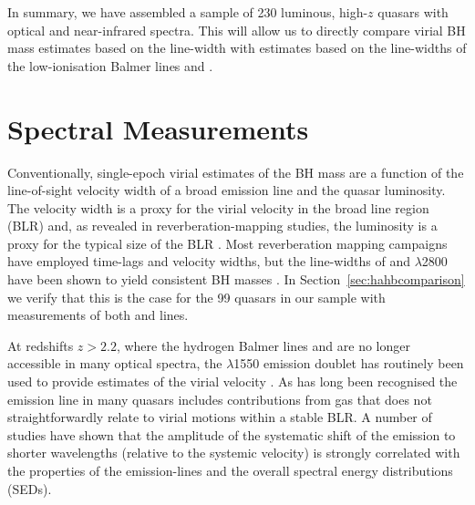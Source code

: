 In summary, we have assembled a sample of 230 luminous, high-$z$ quasars with optical and near-infrared spectra.
This will allow us to directly compare virial BH mass estimates based on the  line-width with estimates based on the line-widths of the low-ionisation Balmer lines \ha and \hbns.  

\section{Spectral Measurements}

Conventionally, single-epoch virial estimates of the BH mass are a function of the line-of-sight velocity width of a broad emission line and the quasar luminosity. 
The velocity width is a proxy for the virial velocity in the broad line region (BLR) and, as revealed in reverberation-mapping studies, the luminosity is a proxy for the typical size of the BLR \citep[the $R-L$ relation; e.g.][]{kaspi00,kaspi07}. 
Most reverberation mapping campaigns have employed \hb time-lags and velocity widths, but the line-widths of \ha and $\lambda$2800 have been shown to yield consistent BH masses \citep[e.g.][]{mclure02,greene05,onken08,shen08,wang09,rafiee11,mejia-restrepo16}. 
In Section~\ref{sec:hahbcomparison} we verify that this is the case for the 99 quasars in our sample with measurements of both \ha and \hb lines.     

At redshifts $z> 2.2$, where the hydrogen Balmer lines and  are no longer accessible in many optical spectra, the $\lambda$1550 emission doublet has routinely been used to provide estimates of the virial velocity \citep[e.g.][]{shen11}. 
As has long been recognised \citep{gaskell82, tytler92} the  emission line in many quasars includes contributions from gas that does not straightforwardly relate to virial motions within a stable BLR.
A number of studies \citep[e.g.][]{shen08, richards11} have shown that the amplitude of the systematic shift of the  emission to shorter wavelengths (relative to the systemic velocity) is strongly correlated with the properties of the emission-lines and the overall spectral energy distributions (SEDs). 

